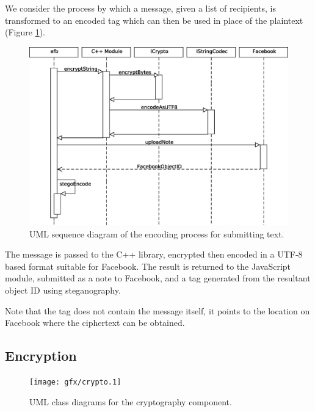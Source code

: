 We consider the process by which a message, given a list of recipients, is transformed to an encoded tag which can then be used in place of the plaintext (Figure \ref{tikz:text}).

    \begin{figure}[tb]
        \begin{center}
                \includegraphics[width=12cm]{gfx/text-seq.eps}
            \caption{UML sequence diagram of the encoding process for submitting text.}
            \label{tikz:text}
        \end{center}
    \end{figure}

The message is passed to the C++ library, encrypted then encoded in a UTF-8 based format suitable for Facebook. The result is returned to the JavaScript module, submitted as a note to Facebook, and a tag generated from the resultant object ID using steganography.

Note that the tag does not contain the message itself, it points to the location on Facebook where the ciphertext can be obtained.

\subsection{Encryption}
\label{ssec:encrypt}

    \begin{figure}[tb]
        \begin{center}
                \texttt{[image: gfx/crypto.1]}
            \caption{UML class diagrams for the cryptography component.}
            \label{uml:crypto}
        \end{center}
    \end{figure}
    
